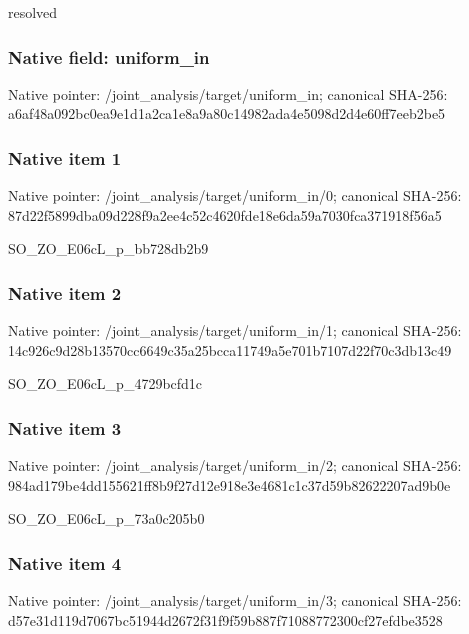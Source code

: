 \documentclass[10pt,a4paper]{article}
\begin{document}
resolved


\subsubsection{Native field: uniform\_in}


Native pointer: /joint\_analysis/target/uniform\_in; canonical SHA-256: a6af48a092bc0ea9e1d1a2ca\allowbreak{}1e8a9a80c14982ada4e5098d\allowbreak{}2d4e60ff7eeb2be5



\subsubsection{Native item 1}


Native pointer: /joint\_analysis/target/uniform\_in/0; canonical SHA-256: 87d22f5899dba09d228f9a2e\allowbreak{}e4c52c4620fde18e6da59a70\allowbreak{}30fca371918f56a5


SO\_ZO\_E06cL\_p\_bb728db2b9


\subsubsection{Native item 2}


Native pointer: /joint\_analysis/target/uniform\_in/1; canonical SHA-256: 14c926c9d28b13570cc6649c\allowbreak{}35a25bcca11749a5e701b710\allowbreak{}7d22f70c3db13c49


SO\_ZO\_E06cL\_p\_4729bcfd1c


\subsubsection{Native item 3}


Native pointer: /joint\_analysis/target/uniform\_in/2; canonical SHA-256: 984ad179be4dd155621ff8b9\allowbreak{}f27d12e918e3e4681c1c37d5\allowbreak{}9b82622207ad9b0e


SO\_ZO\_E06cL\_p\_73a0c205b0


\subsubsection{Native item 4}


Native pointer: /joint\_analysis/target/uniform\_in/3; canonical SHA-256: d57e31d119d7067bc51944d2\allowbreak{}672f31f9f59b887f71088772\allowbreak{}300cf27efdbe3528
\end{document}
